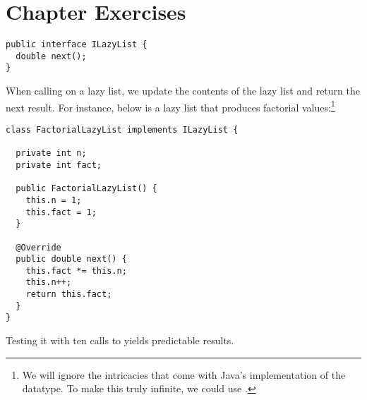 \section*{Chapter Exercises}


\begin{cl}{}
\begin{lstlisting}[language=MyJava]
public interface ILazyList {
  double next();
}
\end{lstlisting}
\end{cl}

When calling  on a lazy list, we update the contents of the lazy list and return the next result. For instance, below is a lazy list that produces factorial values:\footnote{We will ignore the intricacies that come with Java's implementation of the  datatype. To make this truly infinite, we could use .}
\begin{cl}{}
\begin{lstlisting}[language=MyJava]
class FactorialLazyList implements ILazyList {

  private int n;
  private int fact;
 
  public FactorialLazyList() {
    this.n = 1;
    this.fact = 1;
  }

  @Override
  public double next() {
    this.fact *= this.n;
    this.n++;
    return this.fact;
  }
}
\end{lstlisting}
\end{cl}

Testing it with ten calls to  yields predictable results.

